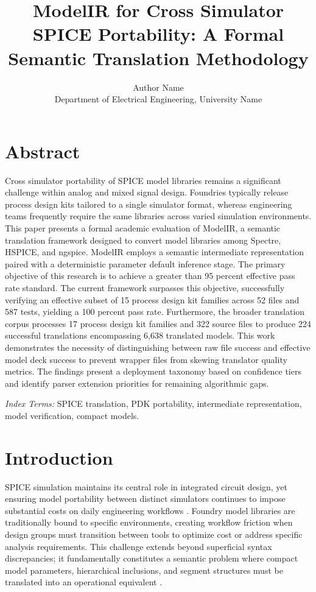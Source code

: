 \documentclass[10pt,twocolumn]{article}
\title{ModelIR for Cross Simulator SPICE Portability: A Formal Semantic Translation Methodology}
\author{Author Name \\ Department of Electrical Engineering, University Name}
\date{}
\begin{document}
\maketitle

\section*{Abstract}
Cross simulator portability of SPICE model libraries remains a significant challenge within analog and mixed signal design. Foundries typically release process design kits tailored to a single simulator format, whereas engineering teams frequently require the same libraries across varied simulation environments. This paper presents a formal academic evaluation of ModelIR, a semantic translation framework designed to convert model libraries among Spectre, HSPICE, and ngspice. ModelIR employs a semantic intermediate representation paired with a deterministic parameter default inference stage. The primary objective of this research is to achieve a greater than 95 percent effective pass rate standard. The current framework surpasses this objective, successfully verifying an effective subset of 15 process design kit families across 52 files and 587 tests, yielding a 100 percent pass rate. Furthermore, the broader translation corpus processes 17 process design kit families and 322 source files to produce 224 successful translations encompassing 6,638 translated models. This work demonstrates the necessity of distinguishing between raw file success and effective model deck success to prevent wrapper files from skewing translator quality metrics. The findings present a deployment taxonomy based on confidence tiers and identify parser extension priorities for remaining algorithmic gaps.

\textit{Index Terms:} SPICE translation, PDK portability, intermediate representation, model verification, compact models.

\section{Introduction}
SPICE simulation maintains its central role in integrated circuit design, yet ensuring model portability between distinct simulators continues to impose substantial costs on daily engineering workflows \cite{r1,r2}. Foundry model libraries are traditionally bound to specific environments, creating workflow friction when design groups must transition between tools to optimize cost or address specific analysis requirements. This challenge extends beyond superficial syntax discrepancies; it fundamentally constitutes a semantic problem where compact model parameters, hierarchical inclusions, and segment structures must be translated into an operational equivalent \cite{r3,r4}.
\end{document}

